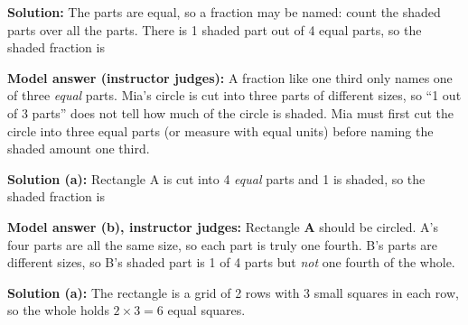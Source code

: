 \documentclass[12pt]{article}
\begin{document}



\textbf{Solution:} The parts are equal, so a fraction may be named: count the
shaded parts over all the parts. There is 1 shaded part out of 4 equal parts,
so the shaded fraction is 


\textbf{Model answer (instructor judges):} A fraction like one third only names
one of three \emph{equal} parts. Mia's circle is cut into three parts of
different sizes, so ``1 out of 3 parts'' does not tell how much of the circle
is shaded. Mia must first cut the circle into three equal parts (or measure
with equal units) before naming the shaded amount one third.


\textbf{Solution (a):} Rectangle A is cut into 4 \emph{equal} parts and 1 is
shaded, so the shaded fraction is 

\textbf{Model answer (b), instructor judges:} Rectangle \textbf{A} should be
circled. A's four parts are all the same size, so each part is truly one
fourth. B's parts are different sizes, so B's shaded part is 1 of 4 parts but
\emph{not} one fourth of the whole.


\textbf{Solution (a):} The rectangle is a grid of 2 rows with 3 small squares
in each row, so the whole holds $2 \times 3 = 6$ equal squares. 
\end{document}
